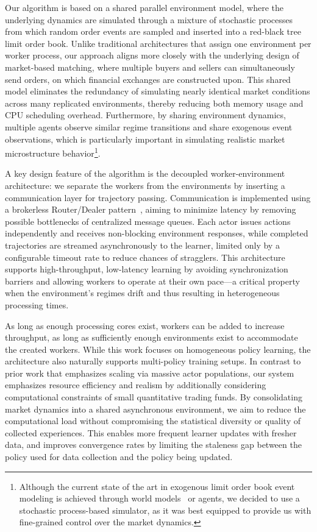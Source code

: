 Our algorithm is based on a shared parallel environment model, where the underlying dynamics are simulated
through a mixture of stochastic processes from which random order events are sampled and inserted into a red-black tree limit order book.
Unlike traditional architectures that assign one environment per worker process,
our approach aligns more closely with the underlying design of market-based matching,
where multiple buyers and sellers can simultaneously send orders, on which financial exchanges are constructed upon.
This shared model eliminates the redundancy of simulating nearly identical market conditions across many replicated environments,
thereby reducing both memory usage and CPU scheduling overhead.
Furthermore, by sharing environment dynamics, multiple agents observe similar regime transitions and share exogenous event observations,
which is particularly important in simulating realistic market microstructure behavior\footnote{
    Although the current state of the art in exogenous limit order book event modeling is achieved through world models~\citep{Coletta2022} or agents,
    we decided to use a stochastic process-based simulator, as it was best equipped to provide us with fine-grained control over the market dynamics.
}.

A key design feature of the algorithm is the decoupled worker-environment architecture:
we separate the workers from the environments by inserting a communication layer for trajectory passing.
Communication is implemented using a brokerless Router/Dealer pattern~\citep{Hintjens2013}, aiming to minimize latency by
removing possible bottlenecks of centralized message queues.
Each actor issues actions independently and receives non-blocking environment responses,
while completed trajectories are streamed asynchronously to the learner,
limited only by a configurable timeout rate to reduce chances of stragglers.
This architecture supports high-throughput, low-latency learning by avoiding synchronization barriers and
allowing workers to operate at their own pace---a critical property when the environment's regimes drift and
thus resulting in heterogeneous processing times.

As long as enough processing cores exist, workers can be added to increase throughput, as long
as sufficiently enough environments exist to accommodate the created workers.
While this work focuses on homogeneous policy learning, the architecture also naturally supports multi-policy training setups.
In contrast to prior work that emphasizes scaling via massive actor populations,
our system emphasizes resource efficiency and realism by additionally considering computational constraints of small quantitative trading funds.
By consolidating market dynamics into a shared asynchronous environment,
we aim to reduce the computational load without compromising the statistical diversity or quality of collected experiences.
This enables more frequent learner updates with fresher data, and improves convergence rates by limiting the staleness gap
between the policy used for data collection and the policy being updated.

